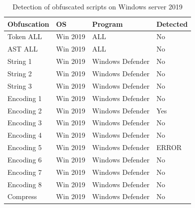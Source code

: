 \documentclass{article}%
\begin{document}
\begin{table}[]
\caption {Detection of obfuscated scripts on Windows server 2019} \label{tab:table_five}
\begin{center}
\begin{tabular}{|l|l|l|l|}
\hline
Obfuscation & OS       & Program          & Detected \\ \hline
Token ALL   & Win 2019 & ALL              & No       \\ \hline
AST ALL     & Win 2019 & ALL              & No       \\ \hline
String 1    & Win 2019 & Windows Defender & No       \\ \hline
String 2    & Win 2019 & Windows Defender & No       \\ \hline
String 3    & Win 2019 & Windows Defender & No       \\ \hline
Encoding 1  & Win 2019 & Windows Defender & No       \\ \hline
Encoding 2  & Win 2019 & Windows Defender & Yes      \\ \hline
Encoding 3  & Win 2019 & Windows Defender & No       \\ \hline
Encoding 4  & Win 2019 & Windows Defender & No       \\ \hline
Encoding 5  & Win 2019 & Windows Defender & ERROR    \\ \hline
Encoding 6  & Win 2019 & Windows Defender & No       \\ \hline
Encoding 7  & Win 2019 & Windows Defender & No       \\ \hline
Encoding 8  & Win 2019 & Windows Defender & No       \\ \hline
Compress    & Win 2019 & Windows Defender & No       \\ \hline
\end{tabular}
\end{center}
\end{table}
\end{document}
